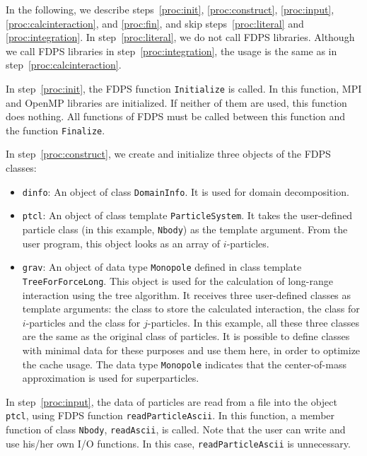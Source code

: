 In the following, we describe  steps~\ref{proc:init},
\ref{proc:construct}, \ref{proc:input}, \ref{proc:calcinteraction},
and \ref{proc:fin}, and skip steps~\ref{proc:literal}
and \ref{proc:integration}.  In step~\ref{proc:literal}, we do not
call FDPS libraries.  Although we call FDPS libraries in
step~\ref{proc:integration}, the usage is the same as in
step~\ref{proc:calcinteraction}.

In step~\ref{proc:init}, the FDPS function \texttt{Initialize} is
called. In this function, MPI and OpenMP libraries are initialized. If
neither of them are used, this function does nothing.  All functions
of FDPS must be called between this function and the
function \texttt{Finalize}.

In step~\ref{proc:construct}, we create and initialize three objects
of the FDPS classes:
\begin{itemize}
\item \texttt{dinfo}: An object of class \texttt{DomainInfo}. It is
  used for domain decomposition.

\item \texttt{ptcl}: An object of class template \texttt{ParticleSystem}.
It takes the user-defined particle class (in this
example, \texttt{Nbody}) as the template argument. From the user
program, this object looks as an array of $i$-particles.

\item \texttt{grav}: An object of  data type \texttt{Monopole} defined in
class template \texttt{TreeForForceLong}. This object is used for the
calculation of long-range interaction using the tree algorithm.  It
receives three user-defined classes as template arguments: the class
to store the calculated interaction, the class for $i$-particles and
the class for $j$-particles. In this example, all these three classes
are the same as the original class of particles.  It is possible to
define classes with minimal data for these purposes and use them here,
in order to optimize the cache usage. The data type \texttt{Monopole}
indicates that the center-of-mass approximation is used for
superparticles.
\end{itemize}

In step~\ref{proc:input}, the data of particles are read from a file
into the object \texttt{ptcl}, using  FDPS
function \texttt{readParticleAscii}. In this function, a member
function of class \texttt{Nbody}, \texttt{readAscii}, is called. Note
that the user can write and use his/her own I/O functions. In this case,
\texttt{readParticleAscii} is unnecessary.

